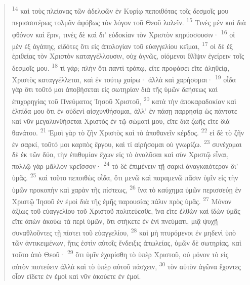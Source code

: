 \documentclass{article}
\begin{document}
\begin{verse}
\textsuperscript{14} καὶ τοὺς πλείονας τῶν ἀδελφῶν ἐν Κυρίῳ πεποιθότας τοῖς δεσμοῖς μου περισσοτέρως τολμᾶν ἀφόβως τὸν λόγον τοῦ Θεοῦ λαλεῖν.
\textsuperscript{15} Τινὲς μὲν καὶ διὰ φθόνον καὶ ἔριν, τινὲς δὲ καὶ δι’ εὐδοκίαν τὸν Χριστὸν κηρύσσουσιν·
\textsuperscript{16} οἱ μὲν ἐξ ἀγάπης, εἰδότες ὅτι εἰς ἀπολογίαν τοῦ εὐαγγελίου κεῖμαι,
\textsuperscript{17} οἱ δὲ ἐξ ἐριθείας τὸν Χριστὸν καταγγέλλουσιν, οὐχ ἁγνῶς, οἰόμενοι θλῖψιν ἐγείρειν τοῖς δεσμοῖς μου.
\textsuperscript{18} τί γάρ; πλὴν ὅτι παντὶ τρόπῳ, εἴτε προφάσει εἴτε ἀληθείᾳ, Χριστὸς καταγγέλλεται, καὶ ἐν τούτῳ χαίρω· ἀλλὰ καὶ χαρήσομαι·
\textsuperscript{19} οἶδα γὰρ ὅτι τοῦτό μοι ἀποβήσεται εἰς σωτηρίαν διὰ τῆς ὑμῶν δεήσεως καὶ ἐπιχορηγίας τοῦ Πνεύματος Ἰησοῦ Χριστοῦ,
\textsuperscript{20} κατὰ τὴν ἀποκαραδοκίαν καὶ ἐλπίδα μου ὅτι ἐν οὐδενὶ αἰσχυνθήσομαι, ἀλλ’ ἐν πάσῃ παρρησίᾳ ὡς πάντοτε καὶ νῦν μεγαλυνθήσεται Χριστὸς ἐν τῷ σώματί μου, εἴτε διὰ ζωῆς εἴτε διὰ θανάτου.
\textsuperscript{21} Ἐμοὶ γὰρ τὸ ζῆν Χριστὸς καὶ τὸ ἀποθανεῖν κέρδος.
\textsuperscript{22} εἰ δὲ τὸ ζῆν ἐν σαρκί, τοῦτό μοι καρπὸς ἔργου, καὶ τί αἱρήσομαι οὐ γνωρίζω.
\textsuperscript{23} συνέχομαι δὲ ἐκ τῶν δύο, τὴν ἐπιθυμίαν ἔχων εἰς τὸ ἀναλῦσαι καὶ σὺν Χριστῷ εἶναι, πολλῷ γὰρ μᾶλλον κρεῖσσον·
\textsuperscript{24} τὸ δὲ ἐπιμένειν τῇ σαρκὶ ἀναγκαιότερον δι’ ὑμᾶς.
\textsuperscript{25} καὶ τοῦτο πεποιθὼς οἶδα, ὅτι μενῶ καὶ παραμενῶ πᾶσιν ὑμῖν εἰς τὴν ὑμῶν προκοπὴν καὶ χαρὰν τῆς πίστεως,
\textsuperscript{26} ἵνα τὸ καύχημα ὑμῶν περισσεύῃ ἐν Χριστῷ Ἰησοῦ ἐν ἐμοὶ διὰ τῆς ἐμῆς παρουσίας πάλιν πρὸς ὑμᾶς.
\textsuperscript{27} Μόνον ἀξίως τοῦ εὐαγγελίου τοῦ Χριστοῦ πολιτεύεσθε, ἵνα εἴτε ἐλθὼν καὶ ἰδὼν ὑμᾶς εἴτε ἀπὼν ἀκούω τὰ περὶ ὑμῶν, ὅτι στήκετε ἐν ἑνὶ πνεύματι, μιᾷ ψυχῇ συναθλοῦντες τῇ πίστει τοῦ εὐαγγελίου,
\textsuperscript{28} καὶ μὴ πτυρόμενοι ἐν μηδενὶ ὑπὸ τῶν ἀντικειμένων, ἥτις ἐστὶν αὐτοῖς ἔνδειξις ἀπωλείας, ὑμῶν δὲ σωτηρίας, καὶ τοῦτο ἀπὸ Θεοῦ·
\textsuperscript{29} ὅτι ὑμῖν ἐχαρίσθη τὸ ὑπὲρ Χριστοῦ, οὐ μόνον τὸ εἰς αὐτὸν πιστεύειν ἀλλὰ καὶ τὸ ὑπὲρ αὐτοῦ πάσχειν,
\textsuperscript{30} τὸν αὐτὸν ἀγῶνα ἔχοντες οἷον εἴδετε ἐν ἐμοὶ καὶ νῦν ἀκούετε ἐν ἐμοί.
\end{verse}
\end{document}
